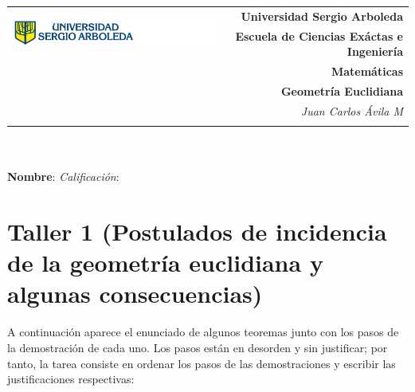 \documentclass[12pt,letterpaper]{exam}
\newcommand{\base}[1]{\underline{\hspace{#1}}}
\newcommand{\uni}{Universidad Sergio Arboleda}
\newcommand{\fac}{\normalsize{Escuela de Ciencias Ex\'actas e Ingenier\'ia}}
\newcommand{\dep}{Matem\'aticas}
\newcommand{\mat}{Geometría Euclidiana} %
\newcommand{\tema}{} %
\newcommand{\autor}{Juan Carlos Ávila M}
\begin{document}
\begin{tabular}{lr}
    \multirow{2}{*}{\includegraphics[height=1.4cm]{logosergio.png}} &
    {\textbf{\uni}} \\
    & {\textbf{\fac}} \\
    & {\textbf{\dep}} \\
    & {\textbf{\mat \tema}} \\
    & {\textit{\autor}} \\
    & {\textit{}}
\end{tabular}\\
\base{19.5cm}\\
\textbf{Nombre}:  \quad 
\textit{Calificaci\'on}: \base{2cm} \\[6pt]

\section*{Taller 1 (Postulados de incidencia de la geometr\'ia euclidiana y algunas consecuencias)}

A continuación aparece el enunciado de algunos teoremas junto con los pasos de la demostración de cada uno. Los pasos están en desorden y sin justificar; por tanto, la tarea consiste en
ordenar los pasos de las demostraciones y escribir las justificaciones respectivas:
\end{document}

